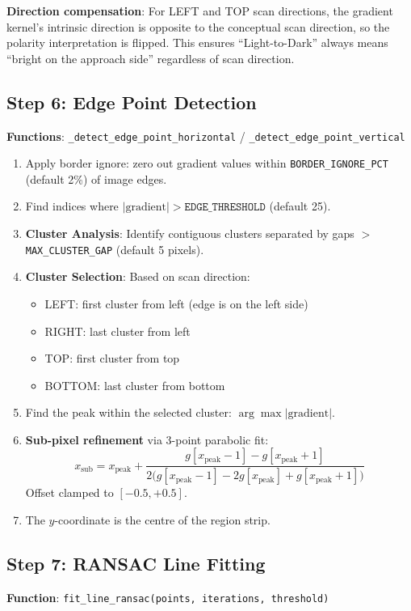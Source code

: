 \documentclass[11pt,a4paper]{article}
\begin{document}
\textbf{Direction compensation}: For LEFT and TOP scan directions, the gradient kernel's intrinsic direction is opposite to the conceptual scan direction, so the polarity interpretation is flipped. This ensures ``Light-to-Dark'' always means ``bright on the approach side'' regardless of scan direction.

\subsection{Step 6: Edge Point Detection}
\textbf{Functions}: \texttt{\_detect\_edge\_point\_horizontal} / \texttt{\_detect\_edge\_point\_vertical}

\begin{enumerate}
\item Apply border ignore: zero out gradient values within \texttt{BORDER\_IGNORE\_PCT} (default 2\%) of image edges.
\item Find indices where $|\text{gradient}| > \texttt{EDGE\_THRESHOLD}$ (default 25).
\item \textbf{Cluster Analysis}: Identify contiguous clusters separated by gaps $>$ \texttt{MAX\_CLUSTER\_GAP} (default 5 pixels).
\item \textbf{Cluster Selection}: Based on scan direction:
  \begin{itemize}
  \item LEFT: first cluster from left (edge is on the left side)
  \item RIGHT: last cluster from left
  \item TOP: first cluster from top
  \item BOTTOM: last cluster from bottom
  \end{itemize}
\item Find the peak within the selected cluster: $\arg\max |\text{gradient}|$.
\item \textbf{Sub-pixel refinement} via 3-point parabolic fit:
\[
x_\text{sub} = x_\text{peak} + \frac{g[x_\text{peak}-1] - g[x_\text{peak}+1]}{2\bigl(g[x_\text{peak}-1] - 2g[x_\text{peak}] + g[x_\text{peak}+1]\bigr)}
\]
Offset clamped to $[-0.5, +0.5]$.
\item The $y$-coordinate is the centre of the region strip.
\end{enumerate}

\subsection{Step 7: RANSAC Line Fitting}
\textbf{Function}: \texttt{fit\_line\_ransac(points, iterations, threshold)}
\end{document}
